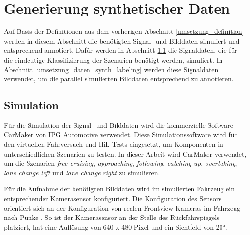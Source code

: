 \section{Generierung synthetischer Daten}
\label{umsetzung_daten_synth}

Auf Basis der Definitionen aus dem vorherigen Abschnitt \ref{umsetzung_definition} werden in diesem Abschnitt die benötigten Signal- und Bilddaten simuliert und entsprechend annotiert. Dafür werden in Abschnitt \ref{umsetzung_daten_synth_simulation} die Signaldaten, die für die eindeutige Klassifizierung der Szenarien benötigt werden, simuliert. In Abschnitt \ref{umsetzung_daten_synth_labeling} werden diese Signaldaten verwendet, um die parallel simulierten Bilddaten entsprechend zu annotieren.
 
\subsection{Simulation}
\label{umsetzung_daten_synth_simulation}

Für die Simulation der Signal- und Bilddaten wird die kommerzielle Software CarMaker von IPG Automotive \cite{ipg2018carmaker} verwendet. Diese Simulationssoftware wird für den virtuellen Fahrversuch und \ac{HiL}-Tests eingesetzt, um Komponenten in unterschiedlichen Szenarien zu testen. In dieser Arbeit wird CarMaker verwendet, um die Szenarien \textit{free cruising}, \textit{approaching}, \textit{following}, \textit{catching up}, \textit{overtaking}, \textit{lane change left} und \textit{lane change right} zu simulieren.

Für die Aufnahme der benötigten Bilddaten wird im simulierten Fahrzeug ein entsprechender Kamerasensor konfiguriert. Die Konfiguration des Sensors orientiert sich an der Konfiguration von realen Frontview-Kameras im Fahrzeug nach Punke \cite{punke2015kamera}. So ist der Kamerasensor an der Stelle des Rückfahrspiegels platziert, hat eine Auflösung von 640 x 480 Pixel und ein Sichtfeld von 20°.

